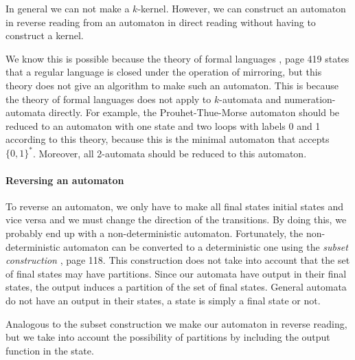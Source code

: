 \documentclass{article}
\theoremstyle{definition}
\begin{document}
In general we can not make a $k$-kernel. However, we can construct an automaton
in reverse reading from an automaton in direct reading without having to 
construct a kernel.

We know this is possible because the theory of formal languages \cite{Wood}, 
page 419 states that a regular language is closed under the operation of 
mirroring, but this theory does not give an algorithm to make such an 
automaton. This is because the theory of formal languages does not apply to 
$k$-automata and numeration-automata directly. For example, the Prouhet-Thue-Morse 
automaton should be reduced to an automaton with one state and two loops with 
labels 0 and 1 according to this theory, because this is the minimal automaton 
that accepts $\{0, 1\}^*$. Moreover, all 2-automata should be reduced to this 
automaton.

\paragraph{Reversing an automaton}
To reverse an automaton, we only have to make all final states initial states
and vice versa and we must change the direction of the transitions. By doing 
this, we probably end up with a non-deterministic automaton. 
Fortunately, the non-deterministic automaton can be converted to a 
deterministic one using the \emph{subset construction} \cite{Wood}, page 118. 
This construction does not take into account that the set of final states may 
have partitions. Since our automata have output in their final states, the 
output induces a partition of the set of final states. General automata do 
not have an output in their states, a state is simply a final state or not.

Analogous to the subset construction we make our automaton in reverse reading, 
but we take into account the possibility of partitions by including the 
output function in the state.
\end{document}
